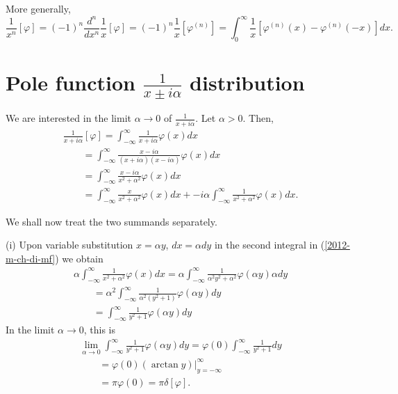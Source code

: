 More generally,
\begin{equation}
\frac{1}{x^n} \left[ \varphi \right]
=
(-1)^n\frac{d^n}{dx^n} \frac{1}{x} \left[ \varphi \right]
=(-1)^n\frac{1}{x} \left[ \varphi ^{(n)} \right] =
\int_0^{\infty}  \frac{1}{x}  \left[  \varphi^{(n)}(x)
-
   \varphi^{(n)}(-x) \right] dx
 .
\end{equation}




\section{Pole function $\frac{1}{x\pm i\alpha}$ distribution}

We are interested in the limit $\alpha  \rightarrow 0$ of $\frac{1}{x+i\alpha}$.
Let  $\alpha >0$. Then,
\begin{equation}
\begin{split}
\frac{1}{x+i\alpha} \left[ \varphi \right]
=
\int_{-\infty}^\infty  \frac{1}{x+i\alpha}  \varphi(x) dx
\\
\qquad
=
\int_{-\infty}^\infty   \frac{x-i\alpha}{ (x+i\alpha)(x-i\alpha) }   \varphi(x) dx
\\
\qquad
=
\int_{-\infty}^\infty   \frac{x-i\alpha}{x^2+ \alpha^2}   \varphi(x) dx
\\
\qquad
=
\int_{-\infty}^\infty   \frac{x}{x^2+ \alpha^2}   \varphi(x) dx
+
-i\alpha \int_{-\infty}^\infty   \frac{1}{x^2+ \alpha^2}   \varphi(x) dx
.
\end{split}
\label{2012-m-ch-di-mf}
\end{equation}

We shall now treat the two summands separately.

(i) Upon variable substitution  $x = \alpha y$, $dx =\alpha dy$ in the second integral in (\ref{2012-m-ch-di-mf}) we obtain
\begin{equation}
\begin{split}
\alpha \int_{-\infty}^\infty   \frac{1}{x^2+ \alpha^2}   \varphi(x) dx
=
\alpha \int_{-\infty}^\infty   \frac{1}{\alpha^2y^2+ \alpha^2}   \varphi(\alpha y) \alpha dy
\\
\qquad
=
\alpha^2 \int_{-\infty}^\infty   \frac{1}{\alpha^2(y^2+ 1)}   \varphi(\alpha y)   dy
\\
\qquad
=
  \int_{-\infty}^\infty   \frac{1}{  y^2+ 1 }   \varphi(\alpha y)   dy
\end{split}
\end{equation}
In the limit $\alpha  \rightarrow 0$, this is
\begin{equation}
\begin{split}
\lim_{\alpha  \rightarrow 0} \int_{-\infty}^\infty   \frac{1}{  y^2+ 1 }   \varphi(\alpha y)   dy
=
\varphi(0) \int_{-\infty}^\infty   \frac{1}{  y^2+ 1 }       dy
\\
\qquad =
\varphi(0) \left. \left( \arctan y \right) \right|_{y=-\infty}^{\infty}
\\
\qquad =
\pi \varphi(0) =
\pi \delta [\varphi ]
.
\end{split}
\end{equation}


